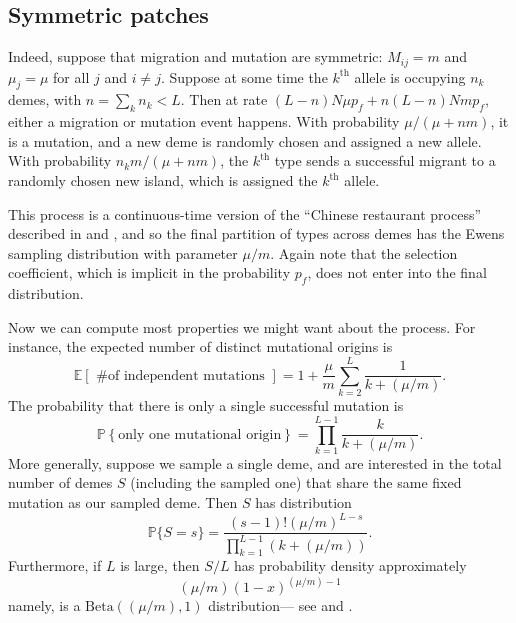 \documentclass{article}
\renewcommand{\P}{\mathbb{P}}
\newcommand{\E}{\mathbb{E}}
\begin{document}
{\subsection{Symmetric patches}

Indeed, suppose that migration and mutation are symmetric: $M_{ij}=m$ and $\mu_j = \mu$ for all $j$ and $i\neq j$.
Suppose at some time the $k^\mathrm{th}$ allele is occupying $n_k$ demes, 
with $n = \sum_k n_k < L$.
Then at rate $(L-n) N \mu p_f + n (L-n) N m p_f$,
either a migration or mutation event happens.
With probability $\mu/(\mu + n m)$, it is a mutation,
and a new deme is randomly chosen and assigned a new allele.
With probability $n_k m / (\mu + n m)$,
the $k^\mathrm{th}$ type sends a successful migrant to a randomly chosen new island,
which is assigned the $k^\mathrm{th}$ allele.

This process is a continuous-time version of the ``Chinese restaurant process''
described in \citet{aldous1985exchangeability} and \citet{pitman1995partitions},
and so the final partition of types across demes has the Ewens sampling distribution with parameter $\mu/m$.
Again note that the selection coefficient, which is implicit in the probability $p_f$,
does not enter into the final distribution.

Now we can compute most properties we might want about the process.
For instance, the expected number of distinct mutational origins is
\begin{equation}
    \E\left[ \mbox{ \# of independent mutations } \right] = 
            1 + \frac{\mu}{m} \sum_{k=2}^L \frac{1}{k+(\mu/m)}. \label{discrete_expected}
\end{equation}
The probability that there is only a single successful mutation is
\begin{equation}
\P \left\{ \mbox{only one mutational origin} \right\} = 
            \prod_{k=1}^{L-1} \frac{ k }{ k+(\mu/m)} .
\end{equation}
More generally, suppose we sample a single deme, and are interested in the total number of demes $S$
(including the sampled one) that share the same fixed mutation as our sampled deme.
Then $S$ has distribution
\begin{equation} \label{eqn:Sdistrn}
\P\{ S=s \} = \frac{ (s-1)! (\mu/m)^{L-s} }{ \prod_{k=1}^{L-1} (k+(\mu/m)) } .
\end{equation}
Furthermore, if $L$ is large, then $S/L$ has probability density approximately
\begin{equation} \label{eqn:betadistrn}
   (\mu/m) (1-x)^{(\mu/m)-1}
\end{equation}
namely, is a $\mathrm{Beta}((\mu/m), 1)$ distribution--- see \cite{donnelly-joyce} and \cite{permanPitmanYor92}.

}
\end{document}
